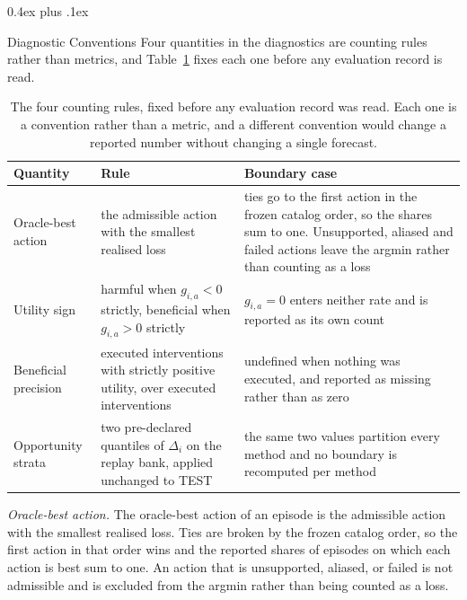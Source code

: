 \documentclass{article}
\makeatletter
\def\subsubsection{\@startsection{subsubsection}{3}{\z@}{-1.2ex plus -0.4ex minus -.2ex}%
  {0.4ex plus .1ex}{\normalsize\sc\raggedright}}
\makeatother
\begin{document}
\subsubsection{Diagnostic Conventions}
\label{app:diagnostic-conventions}
Four quantities in the diagnostics are counting rules rather than metrics, and
Table~\ref{tab:app-counting} fixes each one before any evaluation record is read.

\begin{table}[h]
  \caption{The four counting rules, fixed before any evaluation record was read. Each one is a
  convention rather than a metric, and a different convention would change a reported number
  without changing a single forecast.}
  \label{tab:app-counting}
  \centering
  \small
  \setlength{\tabcolsep}{4pt}
\begin{tabular}{@{}p{} p{} p{}@{}}
    \toprule
    Quantity & Rule & Boundary case \\
    \midrule
    Oracle-best action & the admissible action with the smallest realised loss & ties go to the first action in the frozen catalog order, so the shares sum to one. Unsupported, aliased and failed actions leave the argmin rather than counting as a loss \\
    Utility sign & harmful when $g_{i,a} < 0$ strictly, beneficial when $g_{i,a} > 0$ strictly & $g_{i,a} = 0$ enters neither rate and is reported as its own count \\
    Beneficial precision & executed interventions with strictly positive utility, over executed interventions & undefined when nothing was executed, and reported as missing rather than as zero \\
    Opportunity strata & two pre-declared quantiles of $\Delta_i$ on the replay bank, applied unchanged to TEST & the same two values partition every method and no boundary is recomputed per method \\
    \bottomrule
  \end{tabular}
\end{table}

\emph{Oracle-best action.} The oracle-best action of an episode is the admissible action with
the smallest realised loss. Ties are broken by the frozen catalog order, so the first action in
that order wins and the reported shares of episodes on which each action is best sum to one. An
action that is unsupported, aliased, or failed is not admissible and is excluded from the
argmin rather than being counted as a loss.
\end{document}
